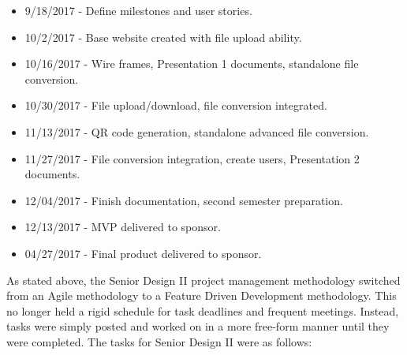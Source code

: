 \begin{itemize}
	\item 9/18/2017   - Define milestones and user stories.
	\item 10/2/2017   - Base website created with file upload ability.
	\item 10/16/2017  - Wire frames, Presentation 1 documents, standalone file conversion.
	\item 10/30/2017  - File upload/download, file conversion integrated.
	\item 11/13/2017  - QR code generation, standalone advanced file conversion.
	\item 11/27/2017  - File conversion integration, create users, Presentation 2 documents.
	\item 12/04/2017  - Finish documentation, second semester preparation.
	\item 12/13/2017  - MVP delivered to sponsor.
	\item 04/27/2017  - Final product delivered to sponsor.
\end{itemize}

As stated above, the Senior Design II project management methodology switched from an Agile methodology to a Feature Driven Development methodology.  
This no longer held a rigid schedule for task deadlines and frequent meetings.
Instead, tasks were simply posted and worked on in a more free-form manner until they were completed. 
The tasks for Senior Design II were as follows:

